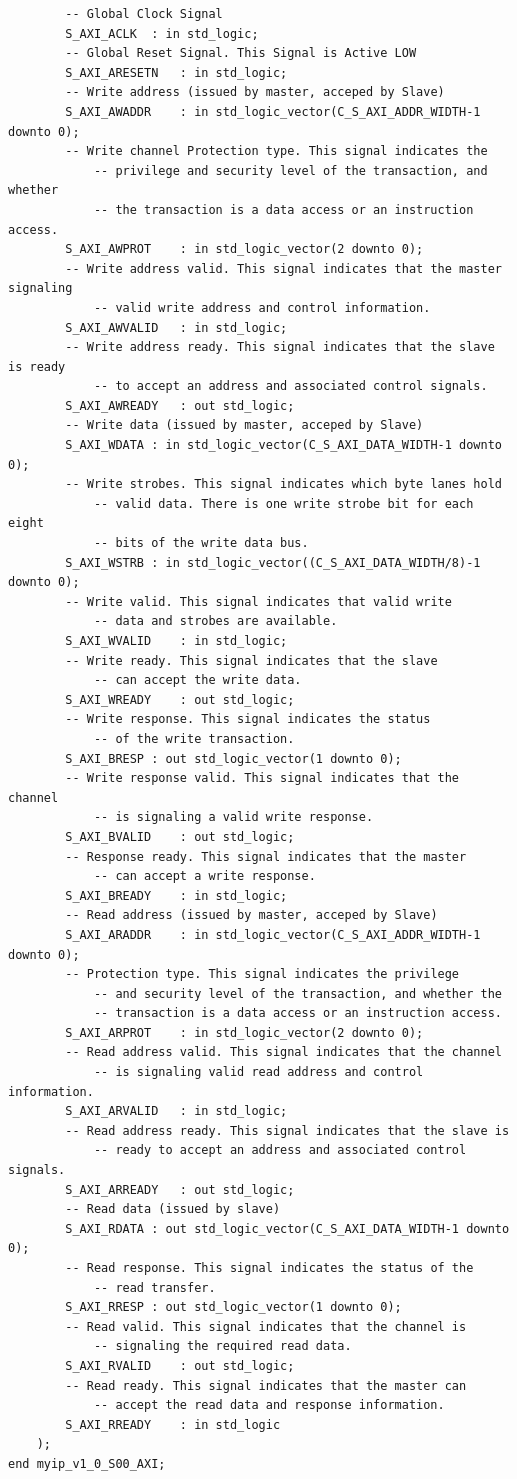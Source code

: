\documentclass[a4paper,openright,12pt]{report}
\begin{document}
\begin{lstlisting}
		-- Global Clock Signal
		S_AXI_ACLK	: in std_logic;
		-- Global Reset Signal. This Signal is Active LOW
		S_AXI_ARESETN	: in std_logic;
		-- Write address (issued by master, acceped by Slave)
		S_AXI_AWADDR	: in std_logic_vector(C_S_AXI_ADDR_WIDTH-1 downto 0);
		-- Write channel Protection type. This signal indicates the
    		-- privilege and security level of the transaction, and whether
    		-- the transaction is a data access or an instruction access.
		S_AXI_AWPROT	: in std_logic_vector(2 downto 0);
		-- Write address valid. This signal indicates that the master signaling
    		-- valid write address and control information.
		S_AXI_AWVALID	: in std_logic;
		-- Write address ready. This signal indicates that the slave is ready
    		-- to accept an address and associated control signals.
		S_AXI_AWREADY	: out std_logic;
		-- Write data (issued by master, acceped by Slave) 
		S_AXI_WDATA	: in std_logic_vector(C_S_AXI_DATA_WIDTH-1 downto 0);
		-- Write strobes. This signal indicates which byte lanes hold
    		-- valid data. There is one write strobe bit for each eight
    		-- bits of the write data bus.    
		S_AXI_WSTRB	: in std_logic_vector((C_S_AXI_DATA_WIDTH/8)-1 downto 0);
		-- Write valid. This signal indicates that valid write
    		-- data and strobes are available.
		S_AXI_WVALID	: in std_logic;
		-- Write ready. This signal indicates that the slave
    		-- can accept the write data.
		S_AXI_WREADY	: out std_logic;
		-- Write response. This signal indicates the status
    		-- of the write transaction.
		S_AXI_BRESP	: out std_logic_vector(1 downto 0);
		-- Write response valid. This signal indicates that the channel
    		-- is signaling a valid write response.
		S_AXI_BVALID	: out std_logic;
		-- Response ready. This signal indicates that the master
    		-- can accept a write response.
		S_AXI_BREADY	: in std_logic;
		-- Read address (issued by master, acceped by Slave)
		S_AXI_ARADDR	: in std_logic_vector(C_S_AXI_ADDR_WIDTH-1 downto 0);
		-- Protection type. This signal indicates the privilege
    		-- and security level of the transaction, and whether the
    		-- transaction is a data access or an instruction access.
		S_AXI_ARPROT	: in std_logic_vector(2 downto 0);
		-- Read address valid. This signal indicates that the channel
    		-- is signaling valid read address and control information.
		S_AXI_ARVALID	: in std_logic;
		-- Read address ready. This signal indicates that the slave is
    		-- ready to accept an address and associated control signals.
		S_AXI_ARREADY	: out std_logic;
		-- Read data (issued by slave)
		S_AXI_RDATA	: out std_logic_vector(C_S_AXI_DATA_WIDTH-1 downto 0);
		-- Read response. This signal indicates the status of the
    		-- read transfer.
		S_AXI_RRESP	: out std_logic_vector(1 downto 0);
		-- Read valid. This signal indicates that the channel is
    		-- signaling the required read data.
		S_AXI_RVALID	: out std_logic;
		-- Read ready. This signal indicates that the master can
    		-- accept the read data and response information.
		S_AXI_RREADY	: in std_logic
	);
end myip_v1_0_S00_AXI;


\end{lstlisting}
\end{document}
